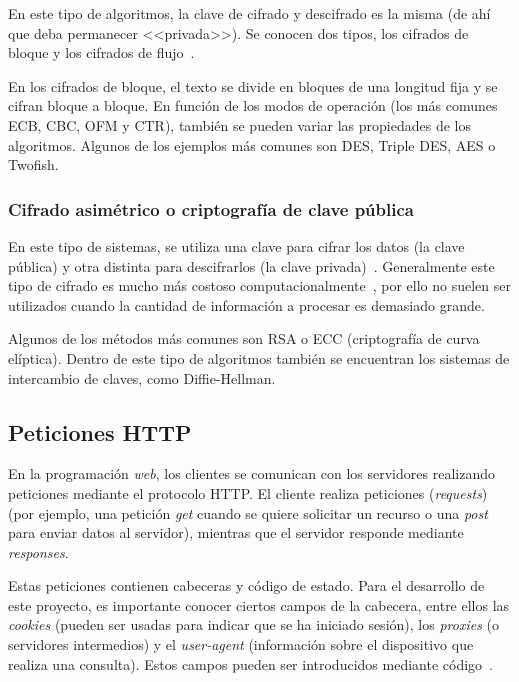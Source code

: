 En este tipo de algoritmos, la clave de cifrado y descifrado es la misma (de ahí que deba permanecer <<privada>>). Se conocen dos tipos, los cifrados de bloque y los cifrados de flujo~\cite{apuntesCybersec}.

En los cifrados de bloque, el texto se divide en bloques de una longitud fija y se cifran bloque a bloque. En función de los modos de operación (los más comunes ECB, CBC, OFM y CTR), también se pueden variar las propiedades de los algoritmos. Algunos de los ejemplos más comunes son DES, Triple DES, AES o Twofish.

\subsubsection{Cifrado asimétrico o criptografía de clave pública}

En este tipo de sistemas, se utiliza una clave para cifrar los datos (la clave pública) y otra distinta para descifrarlos (la clave privada)~\cite{cifradoIBM}. Generalmente este tipo de cifrado es mucho más costoso computacionalmente~\cite{apuntesCybersec}, por ello no suelen ser utilizados cuando la cantidad de información a procesar es demasiado grande. 

Algunos de los métodos más comunes son RSA o ECC (criptografía de curva elíptica). Dentro de este tipo de algoritmos también se encuentran los sistemas de intercambio de claves, como Diffie-Hellman.

\subsection{Peticiones HTTP}

En la programación \textit{web}, los clientes se comunican con los servidores realizando peticiones mediante el protocolo HTTP. El cliente realiza peticiones (\textit{requests}) (por ejemplo, una petición \textit{get} cuando se quiere solicitar un recurso o una \textit{post} para enviar datos al servidor), mientras que el servidor responde mediante \textit{responses}.

Estas peticiones contienen cabeceras y código de estado. Para el desarrollo de este proyecto, es importante conocer ciertos campos de la cabecera, entre ellos las \textit{cookies} (pueden ser usadas para indicar que se ha iniciado sesión), los \textit{proxies} (o servidores intermedios) y el \textit{user-agent} (información sobre el dispositivo que realiza una consulta). Estos campos pueden ser introducidos mediante código~\cite{httpHeaders}.

